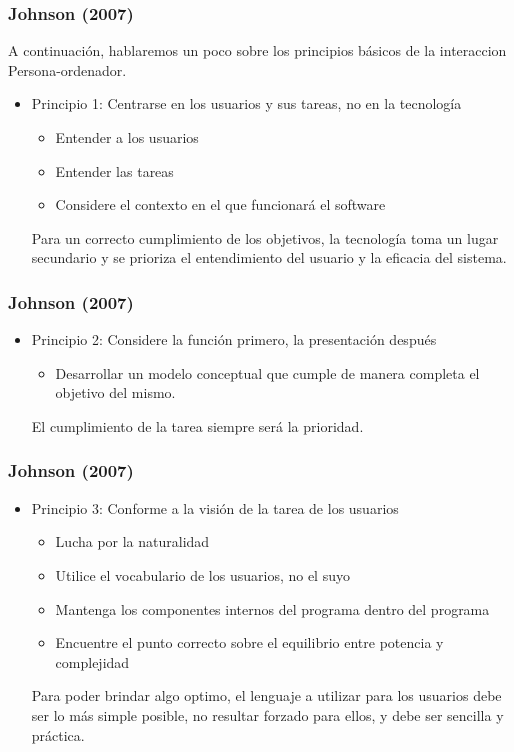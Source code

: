 \documentclass[11pt]{beamer}
\begin{document}
\begin{frame}
\frametitle{Johnson (2007)}
A continuación, hablaremos un poco sobre los principios básicos de la interaccion Persona-ordenador.
\begin{itemize}
\color{red}
\item Principio 1: Centrarse en los usuarios y sus tareas, no en la tecnología
    \par
    \justify
    \color{black}
    \begin{itemize}
    \item Entender a los usuarios
    \item Entender las tareas
    \item Considere el contexto en el que funcionará el software
    \end{itemize}
    \par
    Para un correcto cumplimiento de los objetivos, la tecnología toma un lugar secundario y se prioriza el entendimiento del usuario y la eficacia del sistema.
\end{itemize}
\end{frame}

\begin{frame}
\frametitle{Johnson (2007)}
\begin{itemize}
\color{red}
\item Principio 2: Considere la función primero, la presentación después
    \par
    \justify
    \color{black}
    \begin{itemize}
    \item Desarrollar un modelo conceptual que cumple de manera completa el objetivo del mismo.
    \end{itemize}
     \par
    El cumplimiento de la tarea siempre será la prioridad.
\end{itemize}
\end{frame}

\begin{frame}
\frametitle{Johnson (2007)}
\begin{itemize}
\color{red}
\item Principio 3: Conforme a la visión de la tarea de los usuarios
    \par
    \justify
    \color{black}
    \begin{itemize}
    \item Lucha por la naturalidad
	\item Utilice el vocabulario de los usuarios, no el suyo
	\item Mantenga los componentes internos del programa dentro del programa
	\item Encuentre el punto correcto sobre el equilibrio entre potencia y complejidad
    \end{itemize}
    \par
    Para poder brindar algo optimo, el lenguaje a utilizar para los usuarios debe ser lo más simple posible, no resultar forzado para ellos, y debe ser sencilla y práctica.
\end{itemize}
\end{frame}
\end{document}
